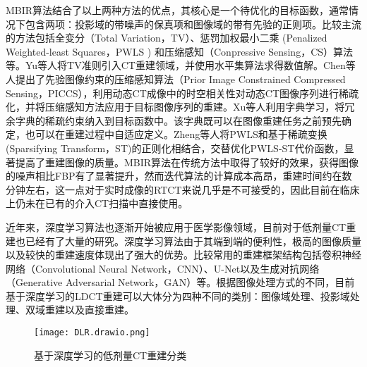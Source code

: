 MBIR算法结合了以上两种方法的优点，其核心是一个待优化的目标函数，通常情况下包含两项：投影域的带噪声的保真项和图像域的带有先验的正则项。比较主流的方法包括全变分（Total Variation，TV）\cite{rudinNonlinearTotalVariation1992}、惩罚加权最小二乘 (Penalized Weighted-least Squares，PWLS )\cite{sauerLocalUpdateStrategy1993} 和压缩感知（Conpressive Sensing，CS）\cite{donohoCompressedSensing2006}算法等。Yu等人将TV准则引入CT重建领域，并使用水平集算法求得数值解\cite{yuTotalVariationBased2005}。Chen等人提出了先验图像约束的压缩感知算法（Prior Image Constrained Compressed Sensing，PICCS），利用动态CT成像中的时空相关性对动态CT图像序列进行稀疏化，并将压缩感知方法应用于目标图像序列的重建\cite{chenPriorImageConstrained2008}。Xu等人利用字典学习，将冗余字典的稀疏约束纳入到目标函数中。该字典既可以在图像重建任务之前预先确定，也可以在重建过程中自适应定义\cite{xuLowDoseXrayCT2012}。Zheng等人将PWLS和基于稀疏变换(Sparsifying Transform，ST)的正则化相结合，交替优化PWLS-ST代价函数，显著提高了重建图像的质量\cite{zhengLowDoseCT2016}。MBIR算法在传统方法中取得了较好的效果，获得图像的噪声相比FBP有了显著提升，然而迭代算法的计算成本高昂，重建时间约在数分钟左右，这一点对于实时成像的RTCT来说几乎是不可接受的，因此目前在临床上仍未在已有的介入CT扫描中直接使用。

近年来，深度学习算法也逐渐开始被应用于医学影像领域，目前对于低剂量CT重建也已经有了大量的研究。深度学习算法由于其端到端的便利性，极高的图像质量以及较快的重建速度体现出了强大的优势。比较常用的重建框架结构包括卷积神经网络（Convolutional Neural Network，CNN）、U-Net\cite{ronnebergerUNetConvolutionalNetworks2015}以及生成对抗网络（Generative Adversarial Network，GAN）\cite{goodfellowGenerativeAdversarialNets2014}等。根据图像处理方式的不同，目前基于深度学习的LDCT重建可以大体分为四种不同的类别：图像域处理、投影域处理、双域重建以及直接重建。

\begin{figure}[!htbp]
  \centering
  \texttt{[image: DLR.drawio.png]}
  \label{fig. DLR}
  \caption{基于深度学习的低剂量CT重建分类}
\end{figure}

